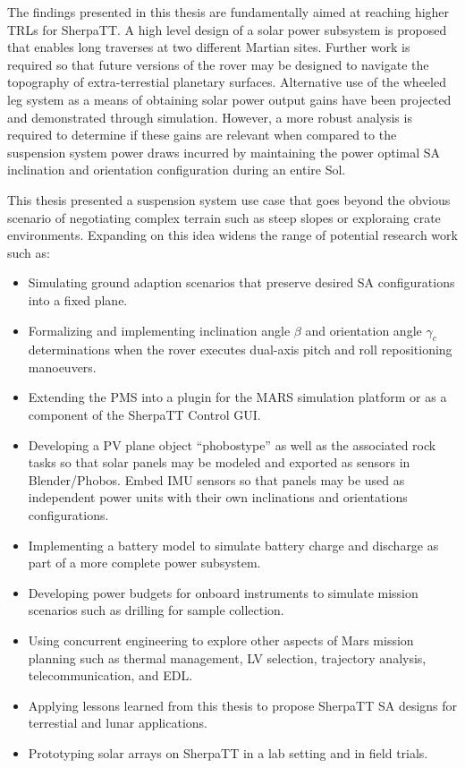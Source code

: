 The findings presented in this thesis are fundamentally aimed at reaching higher \acp{TRL} for SherpaTT. A high level design of a solar power subsystem is proposed that enables long traverses at two different Martian sites. Further work is required so that future versions of the rover may be designed to navigate the topography of extra-terrestial planetary surfaces. Alternative use of the wheeled leg system as a means of obtaining solar power output gains have been projected and demonstrated through simulation. However, a more robust analysis is required to determine if these gains are relevant when compared to the suspension system power draws incurred by maintaining the power optimal \ac{SA} inclination and orientation configuration during an entire Sol.

This thesis presented a suspension system use case that goes beyond the obvious scenario of negotiating complex terrain such as steep slopes or exploraing crate environments. Expanding on this idea widens the range of potential research work such as:

\begin{itemize}
  \item Simulating ground adaption scenarios that preserve desired \ac{SA} configurations into a fixed plane.
  \item Formalizing and implementing  inclination angle $\beta$ and orientation angle $\gamma_{c}$ determinations when the rover executes dual-axis pitch and roll repositioning manoeuvers.
  \item Extending the \ac{PMS} into a plugin for the MARS simulation platform or as a component of the SherpaTT Control GUI.
  \item Developing a \ac{PV} plane object ``phobostype'' as well as the associated rock tasks so that solar panels may be modeled and exported as sensors in Blender/Phobos. Embed \ac{IMU} sensors so that panels may be used as independent power units with their own inclinations and orientations configurations.
  \item Implementing a battery model to simulate battery charge and discharge as part of a more complete power subsystem.
  \item Developing power budgets for onboard instruments to simulate mission scenarios such as drilling for sample collection.
  \item Using concurrent engineering to explore other aspects of Mars mission planning such as thermal management, \ac{LV} selection, trajectory analysis, telecommunication, and \ac{EDL}.
  \item Applying lessons learned from this thesis to propose SherpaTT \ac{SA} designs for terrestial and lunar applications.
  \item Prototyping solar arrays on SherpaTT in a lab setting and in field trials.
\end{itemize}

